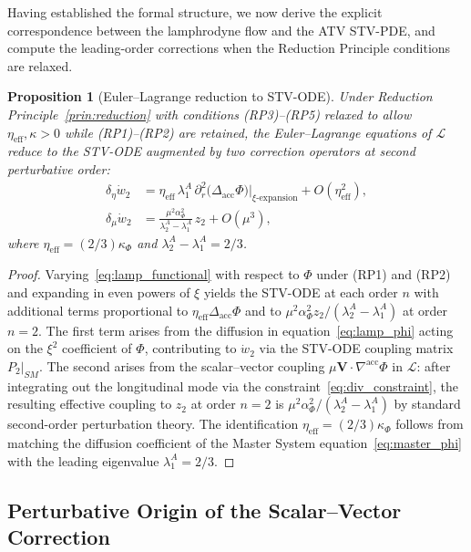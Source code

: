 \documentclass[12pt,a4paper]{article}
\theoremstyle{plain}
\newtheorem{proposition}[theorem]{Proposition}
\theoremstyle{definition}
\theoremstyle{remark}
\newcommand{\Lacc}{\mathcal{L}}
\newcommand{\nabacc}{\nabla^{\!\mathrm{acc}}}
\newcommand{\Delacc}{\Delta_{\mathrm{acc}}}
\newcommand{\SM}{\mathit{SM}}
\newcommand{\etaeff}{\eta_{\mathrm{eff}}}
\newcommand{\lAn}[1]{\lambda^A_{#1}}
\begin{document}
Having established the formal structure, we now derive the explicit correspondence
between the lamphrodyne flow and the ATV STV-PDE, and compute the leading-order
corrections when the Reduction Principle conditions are relaxed.

\begin{proposition}[Euler--Lagrange reduction to STV-ODE]
\label{prop:EL_reduction}
Under Reduction Principle~\ref{prin:reduction} with conditions \textup{(RP3)--(RP5)}
relaxed to allow $\etaeff, \kappa > 0$ while \textup{(RP1)--(RP2)} are retained,
the Euler--Lagrange equations of $\Lacc$ reduce to the STV-ODE augmented by two
correction operators at second perturbative order:
\begin{align}
  \delta_\eta\dot{w}_2
  &= \etaeff\,\lAn{1}\,
     \partial_r^2\bigl(\Delacc\Phi\bigr)\big|_{\xi\text{-expansion}}
     + O(\etaeff^2),
  \label{eq:eta_correction} \\[4pt]
  \delta_\mu\dot{w}_2
  &= \frac{\mu^2\alpha_\Phi^2}{\lAn{2} - \lAn{1}}\,z_2
     + O(\mu^3),
  \label{eq:mu_correction}
\end{align}
where $\etaeff = (2/3)\kappa_\Phi$ and $\lAn{2} - \lAn{1} = 2/3$.
\end{proposition}

\begin{proof}
Varying~\eqref{eq:lamp_functional} with respect to $\Phi$ under \textup{(RP1)} and
\textup{(RP2)} and expanding in even powers of $\xi$ yields the STV-ODE at each order
$n$ with additional terms proportional to $\etaeff\Delta_{\mathrm{acc}}\Phi$ and to
$\mu^2\alpha_\Phi^2 z_2/(\lAn{2}-\lAn{1})$ at order $n=2$. The first term arises
from the diffusion in equation~\eqref{eq:lamp_phi} acting on the $\xi^2$ coefficient
of $\Phi$, contributing to $\dot{w}_2$ via the STV-ODE coupling matrix $P_2|_{\SM}$.
The second arises from the scalar--vector coupling $\mu\mathbf{V}\cdot\nabacc\Phi$ in
$\Lacc$: after integrating out the longitudinal mode via the constraint~\eqref{eq:div_constraint},
the resulting effective coupling to $z_2$ at order $n=2$ is $\mu^2\alpha_\Phi^2/(\lAn{2}-\lAn{1})$
by standard second-order perturbation theory. The identification $\etaeff = (2/3)\kappa_\Phi$
follows from matching the diffusion coefficient of the Master System equation~\eqref{eq:master_phi}
with the leading eigenvalue $\lAn{1} = 2/3$.
\end{proof}

\subsection{Perturbative Origin of the Scalar--Vector Correction}
\label{subsec:perturbative_mu}
\end{document}
